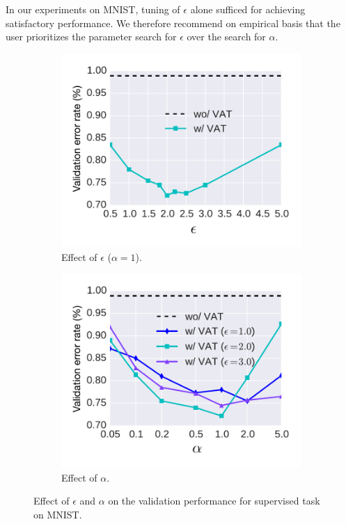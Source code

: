 \documentclass[10pt,journal,compsoc]{IEEEtran}
\begin{document}
In our experiments on MNIST, tuning of $\epsilon$ alone sufficed for achieving satisfactory performance.
We therefore recommend on empirical basis that the user prioritizes the parameter search for $\epsilon$ over the search for $\alpha$. 

\begin{figure}[ht]
	\centering
	\begin{subfigure}{0.24\textwidth}
	\includegraphics[width=\textwidth]{mnist/fixed_err_eps.pdf}
	\caption{\label{fig:mnist_epsilon}Effect of $\epsilon$ ($\alpha=1$).}
    \end{subfigure}
    \begin{subfigure}{0.24\textwidth}
	\includegraphics[width=\textwidth]{mnist/fixed_err_alpha.pdf}
	\caption{\label{fig:mnist_lambda}Effect of $\alpha$.}
    \end{subfigure}
   	\caption{\label{fig:mnist_ep_lambda} Effect of $\epsilon$ and $\alpha$ on the validation performance for supervised task on MNIST.}
\end{figure}
\end{document}
